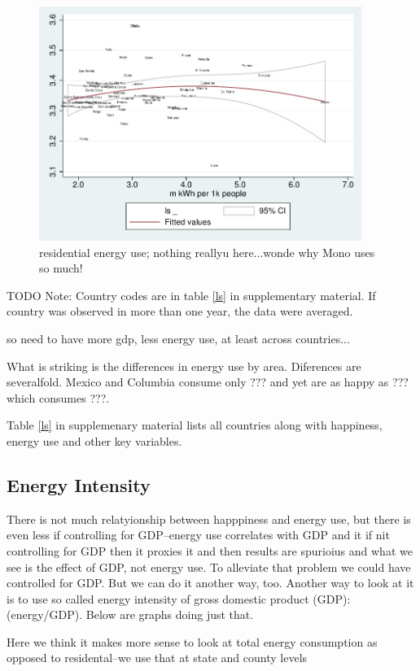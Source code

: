\documentclass[10pt, letterpaper]{article}
\begin{document}
\begin{spacing}{1.4}
\begin{figure}[H]
 \includegraphics[height=3in]{graphsAndTables/lfELERESls.pdf}\centering
\caption{residential energy use; nothing reallyu here...wonde why Mono uses so much!}\label{}
\end{figure}
{\scriptsize TODO Note: Country codes are in table \ref{ls} in supplementary
  material. If country was observed in more than one year, the data were averaged.}

so need to have more gdp, less energy use, at least across countries...

What is striking is the differences in energy use by area. Diferences are
severalfold. Mexico and Columbia
consume only ??? and yet are as happy as ??? which consumes ???.
 
Table \ref{ls} in supplemenary material lists all countries along with
happiness, energy use and other key variables.

\subsection{Energy Intensity}

There is not much relatyionship between happpiness and energy use, but there is
even less if controlling for GDP--energy use correlates with GDP and it if nit
controlling for GDP then it proxies it and then results are spurioius and what
we see is the effect of GDP, not energy use.  
To alleviate that problem we could have controlled for GDP. But we can do it
another way, too. 
Another way to look at it is to use so called energy intensity of gross domestic
product (GDP): (energy/GDP). Below  are graphs doing just that.

Here we think it makes more sense to look at total energy consumption as opposed
to residental--we use  that at state and county levels 


\end{spacing}
\end{document}
